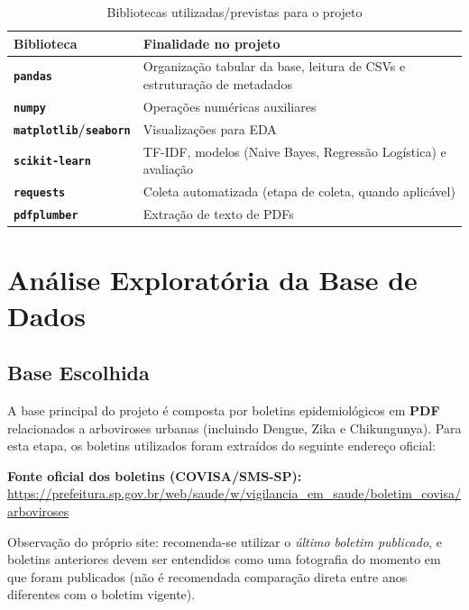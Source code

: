 \begin{table}[h]
\centering
\renewcommand{\arraystretch}{1.25}
\begin{tabularx}{\textwidth}{>{\bfseries}p{3.6cm} Y}
\toprule
Biblioteca & Finalidade no projeto \\
\midrule
\texttt{pandas} & Organização tabular da base, leitura de CSVs e estruturação de metadados \\
\texttt{numpy} & Operações numéricas auxiliares \\
\texttt{matplotlib}/\texttt{seaborn} & Visualizações para EDA \\
\texttt{scikit-learn} & TF-IDF, modelos (Naive Bayes, Regressão Logística) e avaliação \\
\texttt{requests} & Coleta automatizada (etapa de coleta, quando aplicável) \\
\texttt{pdfplumber} & Extração de texto de PDFs \\
\bottomrule
\end{tabularx}
\caption{Bibliotecas utilizadas/previstas para o projeto}
\label{tab:bibliotecas}
\end{table}

\clearpage
\section{Análise Exploratória da Base de Dados}

\subsection{Base Escolhida}

A base principal do projeto é composta por boletins epidemiológicos em \textbf{PDF} relacionados a arboviroses urbanas (incluindo Dengue, Zika e Chikungunya). Para esta etapa, os boletins utilizados foram extraídos do seguinte endereço oficial:

\vspace{0.2cm}
\noindent
\textbf{Fonte oficial dos boletins (COVISA/SMS-SP):} \\
\url{https://prefeitura.sp.gov.br/web/saude/w/vigilancia_em_saude/boletim_covisa/arboviroses}

\vspace{0.2cm}
\noindent
Observação do próprio site: recomenda-se utilizar o \textit{último boletim publicado}, e boletins anteriores devem ser entendidos como uma fotografia do momento em que foram publicados (não é recomendada comparação direta entre anos diferentes com o boletim vigente).

